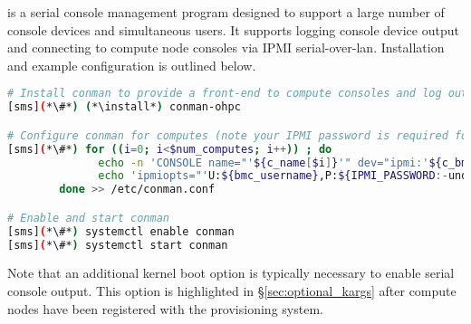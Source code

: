 \conman{} is a serial console management program designed to support a large
number of console devices and simultaneous users. It supports logging console
device output and connecting to compute node consoles via IPMI
serial-over-lan. Installation and example configuration is outlined below.

\begin{lstlisting}[language=bash,keywords={},upquote=true]
# Install conman to provide a front-end to compute consoles and log output
[sms](*\#*) (*\install*) conman-ohpc

# Configure conman for computes (note your IPMI password is required for console access)
[sms](*\#*) for ((i=0; i<$num_computes; i++)) ; do
              echo -n 'CONSOLE name="'${c_name[$i]}'" dev="ipmi:'${c_bmc[$i]}'" '
              echo 'ipmiopts="'U:${bmc_username},P:${IPMI_PASSWORD:-undefined},W:solpayloadsize'"'
        done >> /etc/conman.conf

# Enable and start conman
[sms](*\#*) systemctl enable conman
[sms](*\#*) systemctl start conman
\end{lstlisting}

\noindent Note that an additional kernel boot option is typically necessary to
enable serial console output. This option is highlighted in \S\ref{sec:optional_kargs} after
compute nodes have been registered with the provisioning system.

